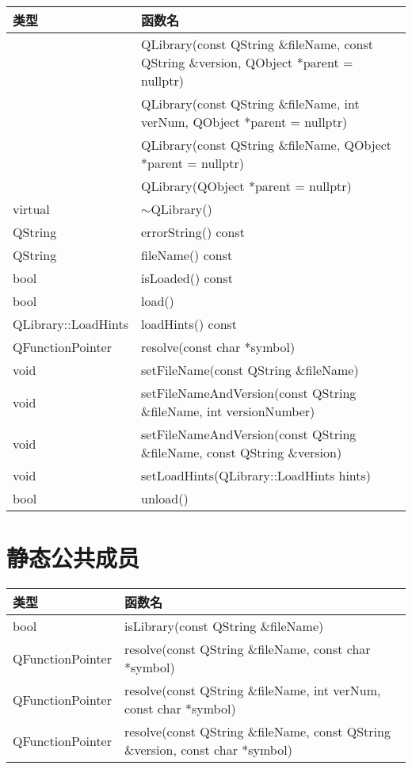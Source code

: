 \begin{longtable}{|l|m{25em}|}
\hline
 类型& 	函数名\\
\hline
	&QLibrary(const QString \&fileName, const QString \&version,
   QObject *parent = nullptr)\\
\hline
	&QLibrary(const QString \&fileName, int verNum, QObject *parent =
   nullptr)\\
\hline
	&QLibrary(const QString \&fileName, QObject *parent = nullptr)\\
\hline
	&QLibrary(QObject *parent = nullptr)\\
\hline
virtual& 	$\sim$QLibrary()\\
\hline
QString& 	errorString() const\\
\hline
QString& 	fileName() const\\
\hline
bool& 	isLoaded() const\\
\hline
bool& 	load()\\
\hline
QLibrary::LoadHints& 	loadHints() const\\
\hline
QFunctionPointer& 	resolve(const char *symbol)\\
\hline
void& 	setFileName(const QString \&fileName)\\
\hline
void& 	setFileNameAndVersion(const QString \&fileName, int versionNumber)\\
\hline
void& 	setFileNameAndVersion(const QString \&fileName, const QString
      \&version)\\
\hline
void& 	setLoadHints(QLibrary::LoadHints hints)\\
\hline
bool& 	unload()\\
\hline
\end{longtable}

\section{静态公共成员}

\begin{tabular}{|l|l|}
\hline
类型& 	函数名\\
\hline
bool& 	isLibrary(const QString \&fileName)\\
\hline
QFunctionPointer& 	resolve(const QString \&fileName, const char
                  *symbol)\\
\hline
QFunctionPointer& 	resolve(const QString \&fileName, int verNum, const char *symbol)\\
\hline
QFunctionPointer& 	resolve(const QString \&fileName, const QString \&version, const char *symbol)\\
\hline
\end{tabular}

